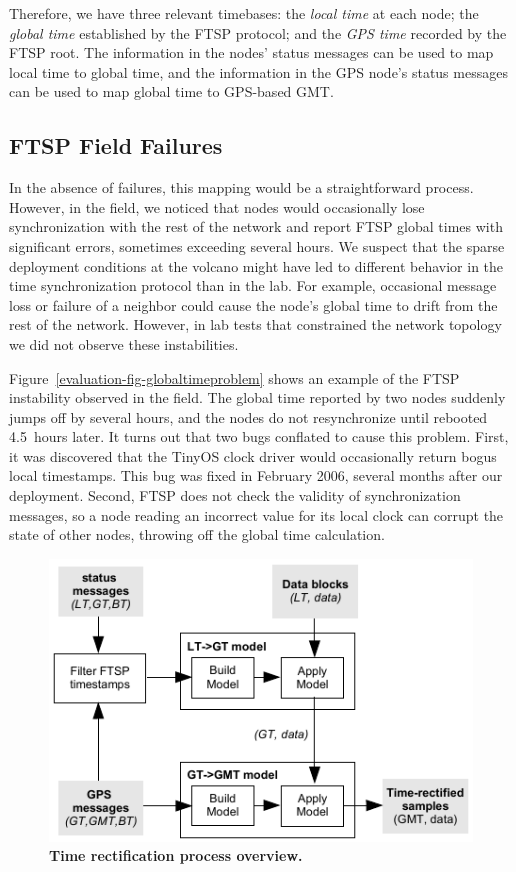 Therefore, we have three relevant timebases: the \textit{local time} at each
node; the \textit{global time} established by the FTSP protocol; and the
\textit{GPS time} recorded by the FTSP root. The information in the nodes'
status messages can be used to map local time to global time, and the
information in the GPS node's status messages can be used to map global time
to GPS-based GMT.

\subsection{FTSP Field Failures}
\label{evaluation-timing-deploymentfailures}

In the absence of failures, this mapping would be a straightforward process.
However, in the field, we noticed that nodes would occasionally lose
synchronization with the rest of the network and report FTSP global times
with significant errors, sometimes exceeding several hours. We suspect that
the sparse deployment conditions at the volcano might have led to different
behavior in the time synchronization protocol than in the lab. For example,
occasional message loss or failure of a neighbor could cause the node's
global time to drift from the rest of the network. However, in lab tests that
constrained the network topology we did not observe these instabilities.

Figure~\ref{evaluation-fig-globaltimeproblem} shows an example of the FTSP
instability observed in the field. The global time reported by two nodes
suddenly jumps off by several hours, and the nodes do not resynchronize until
rebooted 4.5~hours later. It turns out that two bugs conflated to cause this
problem. First, it was discovered that the TinyOS clock driver would
occasionally return bogus local timestamps. This bug was fixed in February
2006, several months after our deployment. Second, FTSP does not check the
validity of synchronization messages, so a node reading an incorrect value
for its local clock can corrupt the state of other nodes, throwing off the
global time calculation.

\begin{figure}[t]
\begin{center}
\includegraphics[width=0.8\hsize]{./3-evaluation/figs/rectificationcartoon.pdf}
\end{center}

\caption{\textbf{Time rectification process overview.}}

\label{evaluation-fig-rectificationcartoon}
\end{figure}

